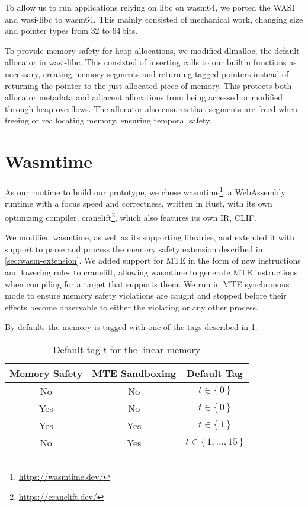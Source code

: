To allow us to run applications relying on libc on wasm64, we ported the \acf{WASI} and wasi-libc to wasm64.
This mainly consisted of mechanical work, changing size and pointer types from 32 to 64\,bits.

To provide memory safety for heap allocations, we modified dlmalloc, the default allocator in wasi-libc.
This consisted of inserting calls to our builtin functions as necessary, creating memory segments and returning tagged pointers instead of returning the pointer to the just allocated piece of memory.
This protects both allocator metadata and adjacent allocations from being accessed or modified through heap overflows.
The allocator also ensures that segments are freed when freeing or reallocating memory, ensuring temporal safety.

\section{Wasmtime}
\label{sec:wasm-runtime}

As our runtime to build our prototype, we chose wasmtime\footnote{\url{https://wasmtime.dev/}}, a WebAssembly runtime with a focus speed and correctness, written in Rust, with its own optimizing compiler, cranelift\footnote{\url{https://cranelift.dev/}}, which also features its own \ac{IR}, \ac{CLIF}.

We modified wasmtime, as well as its supporting libraries, and extended it with support to parse and process the memory safety extension described in \cref{sec:wasm-extension}.
We added support for \ac{MTE} in the form of new instructions and lowering rules to cranelift, allowing wasmtime to generate \ac{MTE} instructions when compiling for a target that supports them.
We run in \ac{MTE} synchronous mode to ensure memory safety violations are caught and stopped before their effects become observable to either the violating or any other process.

By default, the memory is tagged with one of the tags described in \cref{tab:default-tag}.

\begin{table}
  \centering
  \begin{tabular}{c | c || c}
    \textbf{Memory Safety} & \textbf{MTE Sandboxing} & \textbf{Default Tag} \\
    \hline
    No & No & $t \in \{\,0\,\}$ \\
    Yes & No & $t \in \{\,0\,\}$ \\
    Yes & Yes & $t \in \{\,1\,\}$ \\
    No & Yes & $t \in \{\,1, \dots, 15\,\}$
  \end{tabular}
  \caption{Default tag $t$ for the linear memory}
  \label{tab:default-tag}
\end{table}

